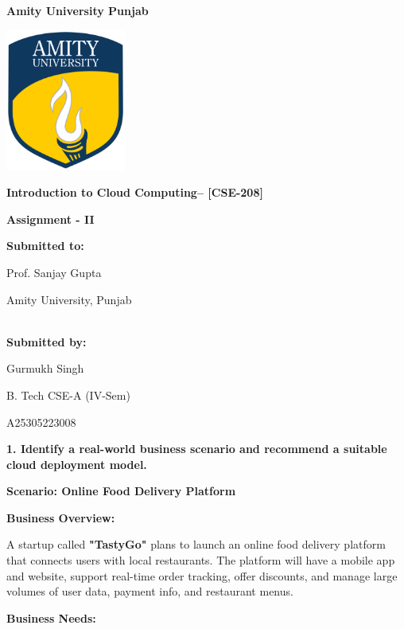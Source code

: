 \documentclass[12pt]{article}
\begin{document}
\begin{center}
  \textbf{Amity University Punjab}
\end{center}

\begin{center}
  \includegraphics[width=1.55625in,height=1.83333in]{media/image.png}
\end{center}

\begin{center}
  \textbf{Introduction to Cloud Computing-- {[}CSE-208{]}}

  \textbf{Assignment - II}

  \vspace{1in}

  \textbf{Submitted to:}

  Prof. Sanjay Gupta

  Amity University, Punjab\\ \\

  \vspace{1in}

  \textbf{Submitted by:}

  Gurmukh Singh

  B. Tech CSE-A (IV-Sem)

  A25305223008
\end{center}

\newpage

\textbf{1. Identify a real-world business scenario and recommend a
suitable cloud deployment model.}

\textbf{Scenario: Online Food Delivery Platform}

\textbf{Business Overview:}

A startup called \textbf{"TastyGo"} plans to launch an online food
delivery platform that connects users with local restaurants. The
platform will have a mobile app and website, support real-time order
tracking, offer discounts, and manage large volumes of user data,
payment info, and restaurant menus.

\textbf{Business Needs:}
\end{document}
